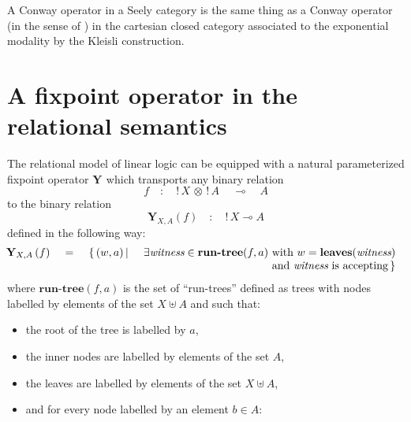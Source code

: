 \documentclass[runningheads,a4paper]{llncs}
\newcommand\red[1]{#1}
\newcommand{\tensor}{\otimes}
\newcommand{\runtree}[2]{\textbf{run-tree}(#1,#2)}
\newcommand{\tree}{\textit{witness}}
\newcommand{\leaves}[1]{\textbf{leaves}(#1)}
\newcommand{\fixpoint}[1]{\textbf{Y}_{#1}}
\begin{document}
\begin{property}
A Conway operator in a Seely category is the same thing as a Conway operator 
(in the sense of \cite{hasegawa,simpson-plotkin}) in the cartesian closed category
associated to the exponential modality by the Kleisli construction.
\end{property}




\section{A fixpoint operator in the relational semantics}
\label{section/finitary-fixpoint}

\red{
The relational model of linear logic can be equipped 
with a natural parameterized fixpoint operator $\fixpoint{}$ which transports any binary relation}
$$
\red{f\quad : \quad !\, X\,\tensor \, !\,A\, \quad \multimap \quad A}
$$
\red{to the binary relation}
$$
\red{\fixpoint{X,A}(f)\quad : \quad !\,X \multimap A}
$$
defined in the following way:
\begin{equation}\label{master-equation}
\begin{tabular}{rclr}
\hspace{-.8em}$\fixpoint{X,A}\,(f)$ & $\, = \,$ & $\{ \, (w,a) \, | \,$ &  $\exists \tree \in \runtree{f}{a} \,\, \mbox{with} \,\, w = \leaves{\tree} $\\
&&& $ \mbox{and } \tree \mbox{ is accepting} \, \}$\\
\end{tabular}
\end{equation}
where $\runtree{f}{a}$ is the set of ``run-trees'' defined as trees
with nodes labelled by elements of the set $X \uplus A$ and such that:
\begin{itemize}
\item the root of the tree is labelled by $a$,
\item the inner nodes are labelled by elements of the set $A$,
\item the leaves are labelled by elements of the set $X \uplus A$,
\item and for every node labelled by an element $b \in A$:
\end{itemize}
\end{document}

